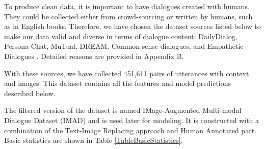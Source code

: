 To produce clean data, it is important to have dialogues created with humans. They could be collected either from crowd-sourcing or written by humans, such as in English books. Therefore, we have chosen the dataset sources listed below to make our data valid and diverse in terms of dialogue content: DailyDialog, Persona Chat, MuTual, DREAM, Common-sense dialogues, and Empathetic Dialogues \cite{Zhang-2018,Li-Su-2017,cui-etal-2020-mutual,Zhou-2021,Rashkin-2018,Sun-2019}. Detailed reasons are provided in Appendix B.

\smallskip

With these sources, we have collected 451,611 pairs of utterances with context and images. This dataset contains all the features and model predictions described below.

\smallskip

The filtered version of the dataset is named IMage-Augmented Multi-modal Dialogue Dataset (IMAD) and is used later for modeling. It is constructed with a combination of the Text-Image Replacing approach and Human Annotated part. Basic statistics are shown in Table \ref{TableBasicStatistics}.